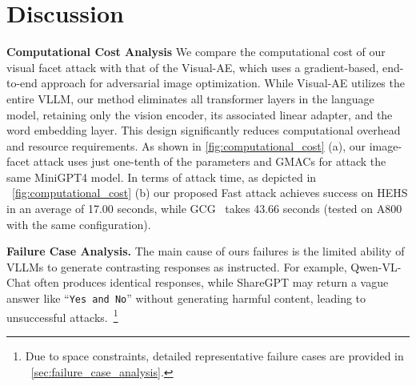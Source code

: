 \section{Discussion}
\noindent\textbf{Computational Cost Analysis}
We compare the computational cost of our visual facet attack with that of the Visual-AE, which uses a gradient-based, end-to-end approach for adversarial image optimization. While Visual-AE utilizes the entire VLLM, our method eliminates all transformer layers in the language model, retaining only the vision encoder, its associated linear adapter, and the word embedding layer. This design significantly reduces computational overhead and resource requirements.
As shown in \cref{fig:computational_cost} (a), our image-facet attack uses just one-tenth of the parameters and GMACs for attack the same
MiniGPT4 model. In terms of attack time, as depicted in ~\cref{fig:computational_cost} (b) our proposed Fast attack achieves success on HEHS \cite{qi2023visual} in an average of 17.00 seconds, while GCG~\cite{gcg} takes 43.66 seconds (tested on A800 with the same configuration). 

\noindent \textbf{Failure Case Analysis.} 
The main cause of ours failures is the limited ability of VLLMs to generate contrasting responses as instructed. For example, Qwen-VL-Chat often produces identical responses, while ShareGPT may return a vague answer like “\texttt{Yes and No}” without generating harmful content, leading to unsuccessful attacks.~\footnote{Due to space constraints, detailed representative failure cases are provided in ~\cref{sec:failure_case_analysis}.}  